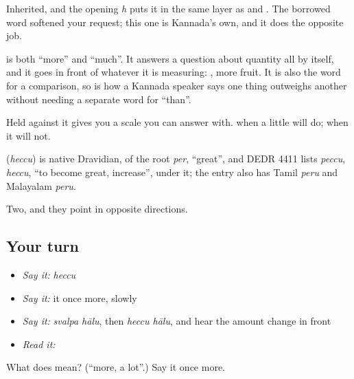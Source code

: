 Inherited, and the opening \emph{h} puts it in the same layer as  and . The borrowed word softened your request; this one is Kannada's own, and it does the opposite job.

 is both \textquotedblleft{}more\textquotedblright{} and \textquotedblleft{}much\textquotedblright{}. It answers a question about quantity all by itself, and it goes in front of whatever it is measuring:  , more fruit. It is also the word for a comparison, so  is how a Kannada speaker says one thing outweighs another without needing a separate word for \textquotedblleft{}than\textquotedblright{}.

Held against  it gives you a scale you can answer with.  when a little will do;  when it will not.

\begin{cousinweb}
\textbf{} (\emph{heccu}) is native Dravidian, of the root \emph{per}, \textquotedblleft{}great\textquotedblright{}, and DEDR 4411 lists \emph{peccu}, \emph{heccu}, \textquotedblleft{}to become great, increase\textquotedblright{}, under it; the entry also has Tamil \emph{peru} and Malayalam \emph{peru}.
\end{cousinweb}

\begin{grammarlens}[title={What you've built}]
Two, and they point in opposite directions.
\end{grammarlens}

\subsection*{Your turn}
\begin{itemize}
\raggedright
  \item \emph{Say it:} \emph{heccu}
  \item \emph{Say it:} it once more, slowly
  \item \emph{Say it:} \emph{svalpa hālu}, then \emph{heccu hālu}, and hear the amount change in front
  \item \emph{Read it:} \textbf{}
\end{itemize}

\begin{tcolorbox}[breakable,colback=teal!4,colframe=teal!35!black,title={Before you move on}]
What does  mean? (\textquotedblleft{}more, a lot\textquotedblright{}.) Say it once more.
\end{tcolorbox}
